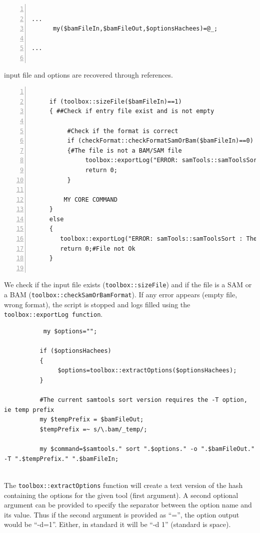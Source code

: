 \documentclass[a4paper,10pt]{report}
\begin{document}
\begin{lstlisting}[numbers=left]

...
      my($bamFileIn,$bamFileOut,$optionsHachees)=@_;
         
...


\end{lstlisting}

input file and options are recovered through references.

\begin{lstlisting}[numbers=left]

     if (toolbox::sizeFile($bamFileIn)==1)
     { ##Check if entry file exist and is not empty
          
          #Check if the format is correct
          if (checkFormat::checkFormatSamOrBam($bamFileIn)==0)
          {#The file is not a BAM/SAM file
               toolbox::exportLog("ERROR: samTools::samToolsSort : The file $bamFileIn is not a SAM/BAM file\n",0);
               return 0;
          }
          
         MY CORE COMMAND
     }
     else
     {
        toolbox::exportLog("ERROR: samTools::samToolsSort : The file $bamFileIn is uncorrect\n",0);
        return 0;#File not Ok
     }
          

\end{lstlisting}

We check if the  input file exists (\texttt{toolbox::sizeFile}) and if the file is a SAM or a BAM (\texttt{toolbox::checkSamOrBamFormat}).
If any error appears (empty file, wrong format), the script is stopped and logs filled using the \texttt{toolbox::exportLog function}.

\begin{lstlisting}
           my $options="";
          
          if ($optionsHachees)
          {
               $options=toolbox::extractOptions($optionsHachees);
          }
          
          #The current samtools sort version requires the -T option, ie temp prefix
          my $tempPrefix = $bamFileOut;
          $tempPrefix =~ s/\.bam/_temp/;
          
          my $command=$samtools." sort ".$options." -o ".$bamFileOut." -T ".$tempPrefix." ".$bamFileIn;
          
\end{lstlisting}

The \texttt{toolbox::extractOptions} function will create a text version of the hash containing the options for the given tool (first argument). A second optional argument can be provided to specify the separator between the option name and its value. Thus if the second argument is provided as ``='', the option output would be ``-d=1''. Either, in standard it will be ``-d 1'' (standard is space).
\end{document}
